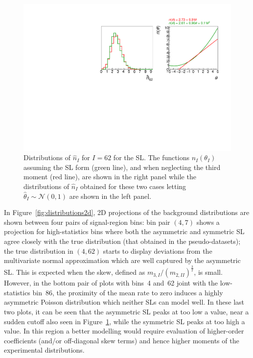 \documentclass[11pt]{article}
\begin{document}
\begin{figure}[ht]
  \centering
  \includegraphics[width=\textwidth]{figures/compare_62}
  \caption{Distributions of $\hat{n}_{I}$ for $I=62$ for the SL.
    The functions $n_{I}(\theta_{I})$ assuming the SL form (green line),
    and when neglecting the third moment (red line), are shown in the right panel while the distributions
    of $\hat{n}_{I}$ obtained for these two cases letting $\hat{\theta}_{I}\sim\mathcal{N}(0,1)$ are shown in the
    left panel.  }
  \label{fig:distributions}
\end{figure}


In Figure~\ref{fig:distributions2d}, 2D projections of the background
distributions are shown between four pairs of signal-region bins: bin pair
$(4,7)$ shows a projection for high-statistics bins where both the asymmetric and symmetric  SL agree closely with the true distribution (that obtained in the pseudo-datasets);
the true distribution in $(4,62)$ starts to display deviations from the multivariate
normal approximation which are well captured by the asymmetric SL. This is
expected when the skew, defined as $m_{3,I}/(m_{2,II})^{\frac{3}{2}}$, is small.
However, in the bottom pair of plots with bins~4 and~62 joint with the low-statistics
bin~86, the proximity of the mean rate to zero induces a highly asymmetric
Poisson distribution which neither SLs can model well. In these last
two plots, it can be seen that the asymmetric SL peaks at too low a value,
near a sudden cutoff also seen in Figure~\ref{fig:distributions}, while the
symmetric SL peaks at too high a value. 
In this region a better modelling would  require
evaluation of higher-order coefficients (and/or off-diagonal skew terms) and
hence higher moments of the experimental distributions.
\end{document}
